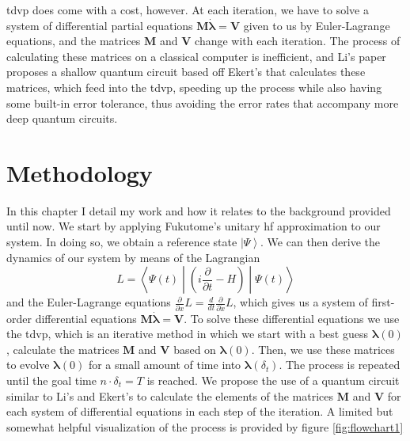 \documentclass{aux/ttuthes2007}
\newcommand{\ket}[1]{\ensuremath{\left|#1\right\rangle}}
\newcommand{\sandwich}[3]{\left< #1 \middle\vert #2 \middle\vert #3 \right>}
\newcommand{\paren}[1]{\left( #1 \right)}
\newcommand{\ddt}{\frac{d}{dt}}
\newcommand{\pdt}{\frac{\partial}{\partial t}}
\newcommand{\pd}[1]{\frac{\partial}{\partial #1}}
\begin{document}
	\gls{tdvp} does come with a cost, however. At each iteration, we have to solve a system of differential partial equations $\bm M \dot {\bm \lambda} = \bm V$ given to us by Euler-Lagrange equations, and the matrices $\bm M$ and $\bm V$ change with each iteration. The process of calculating these matrices on a classical computer is inefficient, and Li's paper  proposes a shallow quantum circuit based off Ekert's  that calculates these matrices, which feed into the \gls{tdvp}, speeding up the process while also having some built-in error tolerance, thus avoiding the error rates that accompany more deep quantum circuits.


\chapter{\textbf{Methodology}}\label{chap:methodology}

In this chapter I detail my work and how it relates to the background provided until now.
We start by applying Fukutome's \cite{fukutome} unitary \gls{hf} approximation to our system. In doing so, we obtain a reference state $\ket\Psi$.
We can then derive the dynamics of our system by means of the Lagrangian
\[
	L = \sandwich {\Psi(t)} {\paren{i\pdt - H}} {\Psi(t)}
\]
and the Euler-Lagrange equations $\pd{x} L = \ddt \pd{\dot x} L$, which gives us a system of first-order differential equations $\bm M \dot{\bm \lambda} = \bm V$.
To solve these differential equations we use the \gls{tdvp}, which is an iterative method in which we start with a best guess $\bm \lambda(0)$, calculate the matrices $\bm M$ and $\bm V$ based on $\bm \lambda(0)$. Then, we use these matrices to evolve $\bm \lambda(0)$ for a small amount of time into $\bm \lambda(\delta_t)$. The process is repeated until the goal time $n\cdot\delta_t = T$ is reached. We propose the use of a quantum circuit similar to Li's \cite{benjamin} and Ekert's  to calculate the elements of the matrices $\bm M$ and $\bm V$ for each system of differential equations in each step of the iteration. A limited but somewhat helpful visualization of the process is provided by figure \ref{fig:flowchart1}
\end{document}
